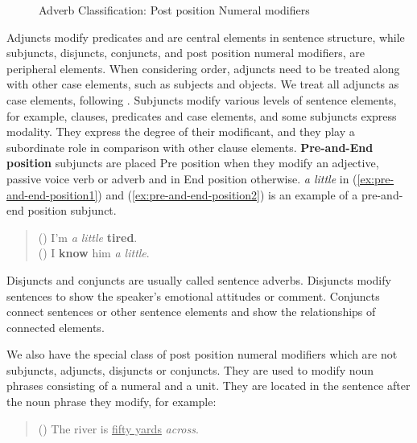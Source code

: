\begin{figure}[tp]
  \caption{Adverb Classification:  Post position Numeral modifiers}
  \label{fig:ppnm}
\end{figure}

Adjuncts modify predicates and are central elements in sentence
structure, while subjuncts\mbox{}, disjuncts, conjuncts, and post position
numeral modifiers, are peripheral elements.  When considering order,
adjuncts need to be treated along with other case elements, such as
subjects and objects. We treat all adjuncts as case elements,
following .  Subjuncts modify various levels of
sentence elements, for example, clauses, predicates and case elements,
and some subjuncts express modality.  They express the degree of their
modificant, and they play a subordinate role in comparison with other
clause elements. {\bf Pre-and-End position} subjuncts are
placed Pre position when they modify an adjective, passive voice verb
or adverb and in End position otherwise. {\em a little} in
(\ref{ex:pre-and-end-position1}) and (\ref{ex:pre-and-end-position2})
is an example of a pre-and-end position subjunct.

\begin{quote}
 \small
 ()
 I'm {\em a little} {\bf tired}. \\
 ()
 I {\bf know} him {\em a little}.
\end{quote}

Disjuncts and conjuncts are usually called
sentence adverbs.  Disjuncts modify sentences to show the speaker's
emotional attitudes or comment.  Conjuncts connect sentences or other
sentence elements and show the relationships of connected elements.

We also have the special class of post position numeral modifiers
which are not subjuncts, adjuncts, disjuncts or conjuncts.
They are used to modify noun phrases consisting of a numeral and a
unit.  They are located in the sentence after the noun phrase they
modify, for example:

\smallskip
\begin{quote}
 \small
 ()
 The river is \underline{fifty yards} {\em across}.
\end{quote}

